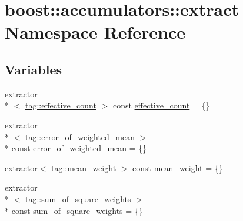 \hypertarget{namespaceboost_1_1accumulators_1_1extract}{\section{boost\-:\-:accumulators\-:\-:extract Namespace Reference}
\label{namespaceboost_1_1accumulators_1_1extract}
}
\subsection*{Variables}
\begin{DoxyCompactItemize}
\item 
extractor\\*
$<$ \hyperlink{structboost_1_1accumulators_1_1tag_1_1effective__count}{tag\-::effective\-\_\-count} $>$ const \hyperlink{namespaceboost_1_1accumulators_1_1extract_a3053aac83dc8752f96916fe5b8d4ce31}{effective\-\_\-count} = \{\}
\item 
extractor\\*
$<$ \hyperlink{structboost_1_1accumulators_1_1tag_1_1error__of__weighted__mean}{tag\-::error\-\_\-of\-\_\-weighted\-\_\-mean} $>$\\*
 const \hyperlink{namespaceboost_1_1accumulators_1_1extract_aa736c1893587667ab411a7d91493e2a5}{error\-\_\-of\-\_\-weighted\-\_\-mean} = \{\}
\item 
extractor$<$ \hyperlink{structboost_1_1accumulators_1_1tag_1_1mean__weight}{tag\-::mean\-\_\-weight} $>$ const \hyperlink{namespaceboost_1_1accumulators_1_1extract_aece73c78440e8b94bdcb26286cf53d99}{mean\-\_\-weight} = \{\}
\item 
extractor\\*
$<$ \hyperlink{structboost_1_1accumulators_1_1tag_1_1sum__of__square__weights}{tag\-::sum\-\_\-of\-\_\-square\-\_\-weights} $>$\\*
 const \hyperlink{namespaceboost_1_1accumulators_1_1extract_a3dfd926200a900b5e56b582630bca0a4}{sum\-\_\-of\-\_\-square\-\_\-weights} = \{\}
\end{DoxyCompactItemize}


